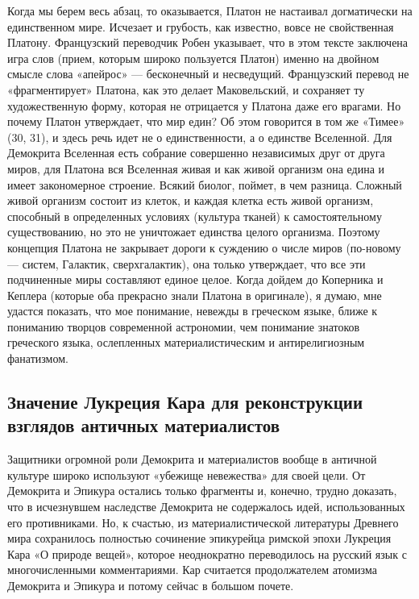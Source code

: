 Когда мы берем весь абзац, то оказывается, Платон не настаивал
догматически на единственном мире. Исчезает и грубость, как известно,
вовсе не свойственная Платону. Французский переводчик Робен указывает,
что в этом тексте заключена игра слов (прием, которым широко
пользуется Платон) именно на двойном смысле слова «апейрос» ---
бесконечный и несведущий. Французский перевод не «фрагментирует»
Платона, как это делает Маковельский, и сохраняет ту художественную
форму, которая не отрицается у Платона даже его врагами. Но почему
Платон утверждает, что мир един? Об этом говорится в том же «Тимее»
(30, 31), и здесь речь идет не о единственности, а о единстве
Вселенной. Для Демокрита Вселенная есть собрание совершенно
независимых друг от друга миров, для Платона вся Вселенная живая и как
живой организм она едина и имеет закономерное строение. Всякий биолог,
поймет, в чем разница. Сложный живой организм состоит из клеток, и
каждая клетка есть живой организм, способный в определенных условиях
(культура тканей) к самостоятельному существованию, но это не
уничтожает единства целого организма. Поэтому концепция Платона не
закрывает дороги к суждению о числе миров (по-новому --- систем,
Галактик, сверхгалактик), она только утверждает, что все эти
подчиненные миры составляют единое целое. Когда дойдем до Коперника и
Кеплера (которые оба прекрасно знали Платона в оригинале), я думаю,
мне удастся показать, что мое понимание, невежды в греческом языке,
ближе к пониманию творцов современной астрономии, чем понимание
знатоков греческого языка, ослепленных материалистическим и
антирелигиозным фанатизмом.

\subsection{Значение Лукреция Кара для реконструкции взглядов античных
материалистов}

Защитники огромной роли Демокрита и материалистов вообще в
античной культуре широко используют «убежище невежества» для своей
цели. От Демокрита и Эпикура остались только фрагменты и, конечно,
трудно доказать, что в исчезнувшем наследстве Демокрита не содержалось
идей, использованных его противниками. Но, к счастью, из
материалистической литературы Древнего мира сохранилось полностью
сочинение эпикурейца римской эпохи Лукреция Кара «О природе вещей»,
которое неоднократно переводилось на русский язык с многочисленными
комментариями. Кар считается продолжателем атомизма Демокрита и
Эпикура и потому сейчас в большом почете.

